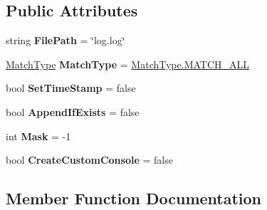 \subsection*{Public Attributes}
\begin{DoxyCompactItemize}
\item 
\mbox{\label{class_a_d_l_1_1_unity_1_1_log_stream_params_a2ed1ac249e30afe029534a0e0cd83acd}} 
string {\bfseries File\+Path} = \char`\"{}log.\+log\char`\"{}
\item 
\mbox{\label{class_a_d_l_1_1_unity_1_1_log_stream_params_a0294891b93285cae2f2f44c667685c24}} 
\mbox{\hyperlink{namespace_a_d_l_af6334296dbae0383a652317263f0bc05}{Match\+Type}} {\bfseries Match\+Type} = \mbox{\hyperlink{namespace_a_d_l_af6334296dbae0383a652317263f0bc05a627c7991c5d0265194247e92fcf120b0}{Match\+Type.\+M\+A\+T\+C\+H\+\_\+\+A\+LL}}
\item 
\mbox{\label{class_a_d_l_1_1_unity_1_1_log_stream_params_ad27da98d363d1b2de2c2acef2aa2ba99}} 
bool {\bfseries Set\+Time\+Stamp} = false
\item 
\mbox{\label{class_a_d_l_1_1_unity_1_1_log_stream_params_ab10680435c136de2248cf8a7fbad1a21}} 
bool {\bfseries Append\+If\+Exists} = false
\item 
\mbox{\label{class_a_d_l_1_1_unity_1_1_log_stream_params_a4ca708b4f6265d958253b4aa6c88ae9f}} 
int {\bfseries Mask} = -\/1
\item 
\mbox{\label{class_a_d_l_1_1_unity_1_1_log_stream_params_a0a044c493acf72de9c5ee1e35575bc13}} 
bool {\bfseries Create\+Custom\+Console} = false
\end{DoxyCompactItemize}


\subsection{Member Function Documentation}
\mbox{\label{class_a_d_l_1_1_unity_1_1_log_stream_params_a511976146d776a6e618baf1e47c99f34}} 
